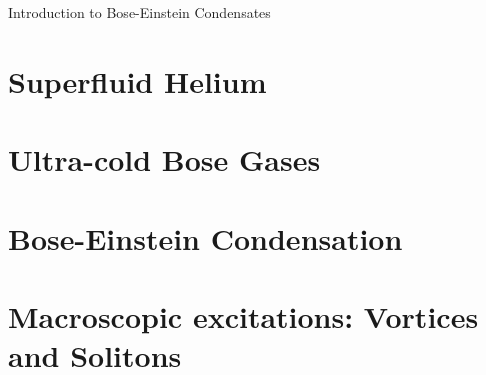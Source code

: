 \begin{chapter}{\label{cha:bose_gasses}Introduction to Bose-Einstein Condensates}
\section{Superfluid Helium}
\section{Ultra-cold Bose Gases}
\section{Bose-Einstein Condensation}
\section{Macroscopic excitations: Vortices and Solitons}
\end{chapter}
